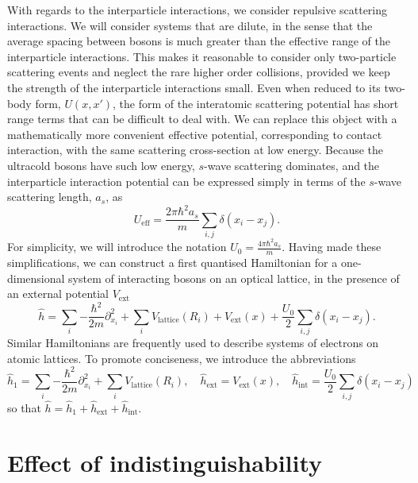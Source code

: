 \documentclass[a4paper, 10pt]{article}
\theoremstyle{plain}
\begin{document}
With regards to the interparticle interactions, we consider repulsive scattering
interactions. We will consider systems that are dilute, in the sense that the
average spacing between bosons is much greater than the effective range of the
interparticle interactions. This makes it reasonable to consider only
two-particle scattering events and neglect the rare higher order collisions,
provided we keep the strength of the interparticle interactions small. Even when
reduced to its two-body form, $U(x,x')$, the form of the interatomic scattering
potential has short range terms that can be difficult to deal with. We can
replace this object with a mathematically more convenient effective potential,
corresponding to contact interaction, with the same scattering cross-section at
low energy. Because the ultracold bosons have such low energy, $s$-wave
scattering dominates, and the interparticle interaction potential can be
expressed simply in terms of the $s$-wave scattering length, $a_{s}$, as
\begin{equation}
    U_{\text{eff}}
    =
    \frac{2 \pi\hbar^{2} a_{s}}{m}
    \sum_{i,j}{\delta(x_{i} - x_{j})}.
\end{equation}
For simplicity, we will introduce the notation $U_{0} = \frac{4 \pi \hbar^{2}
a_{s}}{m}$. Having made these simplifications, we can construct a first
quantised Hamiltonian for a one-dimensional system of interacting bosons on an
optical lattice, in the presence of an external potential $V_{\text{ext}}$
\begin{equation}
    \label{eq:HamiltonianCoordinateRepresentation}
    \hat{h}
    =
    \sum_{i}{-\frac{\hbar^{2}}{2m}  \partial_{x_{i}}^{2}} +
    \sum_{i}{V_{\text{lattice}}(R_{i})} +
    V_{\text{ext}}(x) +
    \frac{U_{0}}{2} \sum_{i,j}{\delta(x_{i} - x_{j})}.
\end{equation}
Similar Hamiltonians are frequently used to describe systems of electrons on
atomic lattices. To promote conciseness, we introduce the abbreviations
\begin{equation*}
    \hat{h}_{1}
    =
    \sum_{i}{-\frac{\hbar^{2}}{2m} \partial_{x_{i}}^{2}} +
    \sum_{i}{V_{\text{lattice}}(R_{i})},
    \quad
    \hat{h}_{\text{ext}}
    =
    V_{\text{ext}}(x),
    \quad
    \hat{h}_{\text{int}}
    =
    \frac{U_{0}}{2} \sum_{i,j}\delta{(x_{i}-x_{j})}
\end{equation*}
so that $\hat{h}=\hat{h}_1+\hat{h}_{\text{ext}}+\hat{h}_{\text{int}}$.


\section{Effect of indistinguishability}
\end{document}
